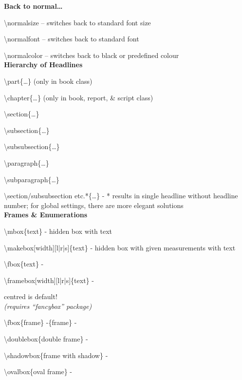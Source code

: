 \documentclass[a4paper,12pt,final]{article}
\begin{document}
\large\textbf{Back to normal\ldots}
\normalsize

\textbackslash normalsize -- switches back to standard font size 

\textbackslash normalfont -- switches back to standard font 

\textbackslash normalcolor -- switches back to black or predefined colour \\


\large\textbf{Hierarchy of Headlines}
\normalsize 

\textbackslash part\{\ldots\} (only in book class)

\textbackslash chapter\{\ldots\} (only in book, report, \& script class) 

\textbackslash section\{\ldots\} 

\textbackslash subsection\{\ldots\} 

\textbackslash subsubsection\{\ldots\} 

\textbackslash paragraph\{\ldots\} 

\textbackslash subparagraph\{\ldots\} 

\textbackslash section/subsubsection etc.*\{\ldots\} - * results in single headline without headline number; for global settings, there are more elegant solutions \\



\newpage
\large \textbf{Frames \& Enumerations}
\normalsize

\textbackslash mbox\{text\} - hidden box with text

\textbackslash makebox[width][l|r|s]\{text\} - hidden box with given measurements with text 

\textbackslash fbox\{text\} - 

\textbackslash framebox[width][l|r|s]\{text\} - 

centred is default! \\


\textsl{(requires ``fancybox'' package)}

\textbackslash fbox\{frame\} -\{frame\} - 

\textbackslash doublebox\{double frame\} - 

\textbackslash shadowbox\{frame with shadow\} - 

\textbackslash ovalbox\{oval frame\} - 
\end{document}
